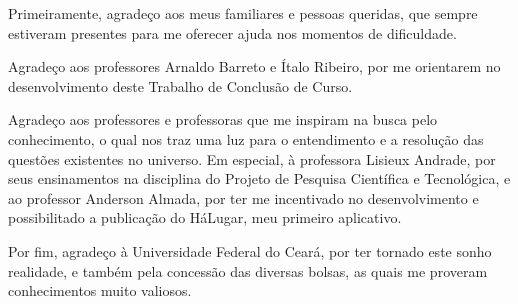Primeiramente, agradeço aos meus familiares e pessoas queridas, que sempre estiveram presentes para me oferecer ajuda nos momentos de dificuldade.

Agradeço aos professores Arnaldo Barreto e Ítalo Ribeiro, por me orientarem no desenvolvimento deste Trabalho de Conclusão de Curso.

Agradeço aos professores e professoras que me inspiram na busca pelo conhecimento, o qual nos traz uma luz para o entendimento e a resolução das questões existentes no universo. Em especial, à professora Lisieux Andrade, por seus ensinamentos na disciplina do Projeto de Pesquisa Científica e Tecnológica, e ao professor Anderson Almada, por ter me incentivado no desenvolvimento e possibilitado a publicação do HáLugar, meu primeiro aplicativo.

Por fim, agradeço à Universidade Federal do Ceará, por ter tornado este sonho realidade, e também pela concessão das diversas bolsas, as quais me proveram conhecimentos muito valiosos.